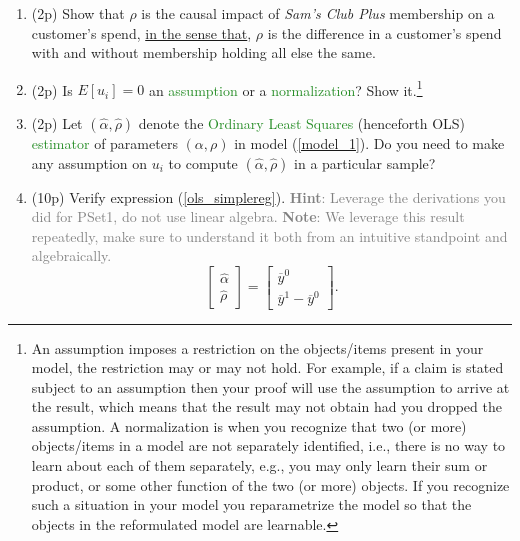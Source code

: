 \documentclass{article}
\begin{document}
\begin{enumerate}[label=\textbf{Q\arabic{enumi}}.,ref=Q\arabic{enumi}, wide=0pt, itemsep=1em, topsep=5pt]
\begin{enumerate}
        \item (2p) Show that $\rho$ is the causal impact of \textit{Sam's Club Plus} membership on a customer's spend, \underline{in the sense that}, $\rho$ is the difference in a customer's spend with and without membership holding all else the same.
        
        \item (2p) Is $E\left[ u _{i}\right] =0$ an \textcolor{ForestGreen}{assumption} or a \textcolor{ForestGreen}{normalization}? Show it.\footnote{An assumption imposes a restriction on the objects/items present in your model, the restriction may or may not hold. For example, if a claim is stated subject to an assumption then your proof will use the assumption to arrive at the result, which means that the result may not obtain had you dropped the assumption. A normalization is when you recognize that two (or more) objects/items in a model are not separately identified, i.e., there is no way to learn about each of them separately, e.g., you may only learn their sum or product, or some other function of the two (or more) objects. If you recognize such a situation in your model you reparametrize the model so that the objects in the reformulated model are learnable.}
                
        \item (2p) Let $\left( \widehat{\alpha },\widehat{\rho }\right) $ denote the \textcolor{ForestGreen}{Ordinary Least Squares} (henceforth OLS) \textcolor{ForestGreen}{estimator} of parameters $\left(\alpha ,\rho \right)$ in model (\ref{model_1}). Do you need to make any assumption on $u _{i}$ to compute $\left( \widehat{\alpha },\widehat{\rho }\right) $ in a particular sample?
        
        \item (10p) Verify expression (\ref{ols_simplereg}). \textcolor{gray}{\textbf{Hint}: Leverage the derivations you did for PSet1, do not use linear algebra. \textbf{Note}: We leverage this result repeatedly, make sure to understand it both from an intuitive standpoint and algebraically.}
        \begin{equation} \label{ols_simplereg}
            \left[ 
            \begin{array}{c}
            \widehat{\alpha } \\ 
            \widehat{\rho }
            \end{array}
            \right] =\left[ 
            \begin{array}{c}
            \overline{y}^{0} \\ 
            \overline{y}^{1}-\overline{y}^{0}
            \end{array}
            \right] \text{.}  
        \end{equation}
        

\end{enumerate}
\end{enumerate}
\end{document}
